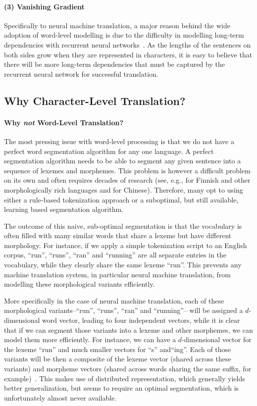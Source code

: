 \documentclass[11pt]{article}
\begin{document}
\paragraph{(3) Vanishing Gradient}
Specifically to neural machine translation, a major reason behind the wide
adoption of word-level modelling is due to the difficulty in modelling long-term
dependencies with recurrent neural
networks~\cite{bengio1994learning,hochreiter1998vanishing}. As the lengths of
the sentences on both sides grow 
when they are represented in characters, it is easy to believe that there will
be more long-term dependencies that must be captured by the recurrent neural
network for successful translation. 

\subsection{Why Character-Level Translation?}

\paragraph{Why {\it not} Word-Level Translation?}
The most pressing issue with word-level processing is that we do not have a
perfect word segmentation algorithm for any one language. A perfect segmentation
algorithm needs to be able to segment any given sentence into a sequence of
lexemes and morphemes. This problem is however a difficult problem on its own
and often requires decades of research (see, e.g., 
for Finnish and other morphologically rich languages and 
for Chinese). Therefore, many opt to using either a rule-based tokenization
approach or a suboptimal, but still available, learning based
segmentation algorithm. 

The outcome of this naive, sub-optimal segmentation is that the vocabulary is
often filled with many similar words that share a lexeme but have different
morphology. For instance, if we apply a simple tokenization script to an English
corpus, ``run'', ``runs'', ``ran'' and ``running'' are all separate entries in
the vocabulary, while they clearly share the same lexeme ``run''. This prevents
any machine translation system, in particular neural machine translation, from
modelling these morphological variants efficiently. 

More specifically in the case of neural machine translation, each of these
morphological variants--``run'', ``runs'', ``ran'' and ``running''-- will be
assigned a $d$-dimensional word vector, leading to four independent vectors,
while it is clear that if we can segment those variants into a lexeme and other
morphemes, we can model them more efficiently. For instance, we can have a
$d$-dimensional vector for the lexeme ``run'' and much smaller vectors for ``s''
and``ing''.  Each of those variants will be then a composite of the lexeme
vector (shared across these variants) and morpheme vectors
(shared across words sharing the same suffix, for example)~\cite{botha2014compositional}. This
makes use of distributed representation, which generally yields better generalization, but seems
to require an optimal segmentation, which is unfortunately almost never available.
\end{document}

